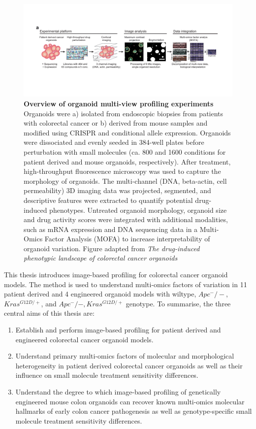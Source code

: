 \begin{flushleft}
\begin{figure}[h]
\centering
\includegraphics[width=\textwidth,
                height=\textheight,
                keepaspectratio]{figures/promise/pdf/fig_1_1.pdf}
\caption[Overview of organoid multi-view profiling experiments]{\textbf{Overview of organoid multi-view profiling experiments} Organoids were a) isolated from endoscopic biopsies from patients with colorectal cancer or b) derived from mouse samples and modified using CRISPR and conditional allele expression. Organoids were dissociated and evenly seeded in 384-well plates before perturbation with small molecules (ca. 800 and 1600 conditions for patient derived and mouse organoids, respectively). After treatment, high-throughput fluorescence microscopy was used to capture the morphology of organoids.  The multi-channel (DNA, beta-actin, cell permeability) 3D imaging data was projected, segmented, and descriptive features were extracted to quantify potential drug-induced phenotypes. Untreated organoid morphology, organoid size and drug activity scores were integrated with additional modalities, such as mRNA expression and DNA sequencing data in a Multi-Omics Factor Analysis (MOFA) to increase interpretability of organoid variation. Figure adapted from \textit{The drug-induced phenotypic landscape of colorectal cancer organoids} \citep{betgeDruginducedPhenotypicLandscape2022}}
\label{fig_130}
\end{figure}

This thesis introduces image-based profiling for colorectal cancer organoid models. The method is used to understand multi-omics factors of variation in 11 patient derived and 4 engineered organoid models with wiltype, $Apc^-/-$, $Kras^{G12D/+}$, and $Apc^-/-, Kras^{G12D/+}$ genotype. To summarise, the three central aims of this thesis are:
\begin{enumerate}
    \item Establish and perform image-based profiling for patient derived and engineered colorectal cancer organoid models.
    \item Understand primary multi-omics factors of molecular and morphological heterogeneity in patient derived colorectal cancer organoids as well as their influence on small molecule treatment sensitivity differences.
    \item Understand the degree to which image-based profiling of genetically engineered mouse colon organoids can recover known multi-omics molecular hallmarks of early colon cancer pathogenesis as well as genotype-specific small molecule treatment sensitivity differences.
\end{enumerate}


\end{flushleft}